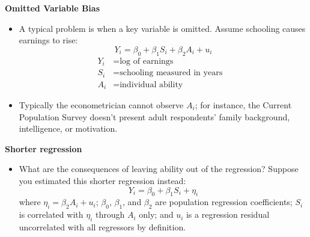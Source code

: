 \documentclass[notes=show]{beamer}
\begin{document}
\begin{frame}[plain]
	\begin{center}
	\textbf{Omitted Variable Bias}
	\end{center}

	\begin{itemize}
	\item A typical problem is when a key variable is omitted.  Assume schooling causes earnings to rise:$$Y_i=\beta_0 + \beta_1{S}_i + \beta_2{A}_i + u_i$$\begin{align*}Y_i&=\text{log of earnings}& \\
		S_i&=\text{schooling measured in years} \\
		A_i&=\text{individual ability}
		\end{align*}
	\item Typically the econometrician cannot observe $A_i$; for instance, the Current Population Survey doesn't present adult respondents' family background, intelligence, or motivation.  
	\end{itemize}
	
\end{frame}

\begin{frame}[plain]
	\begin{center}
	\textbf{Shorter regression}
	\end{center}

\begin{itemize}
	\item What are the consequences of leaving ability out of the regression? Suppose you estimated this shorter regression instead:$$Y_i=\beta_0 + \beta_1{S}_i + \eta_i$$where $\eta_i=\beta_2{A}_i + u_i$; $\beta_0$, $\beta_1$, and $\beta_2$ are population regression coefficients; $S_i$ is correlated with $\eta_i$ through $A_i$ only; and $u_i$ is a regression residual uncorrelated with all regressors by definition.
\end{itemize}
\end{frame}
\end{document}
